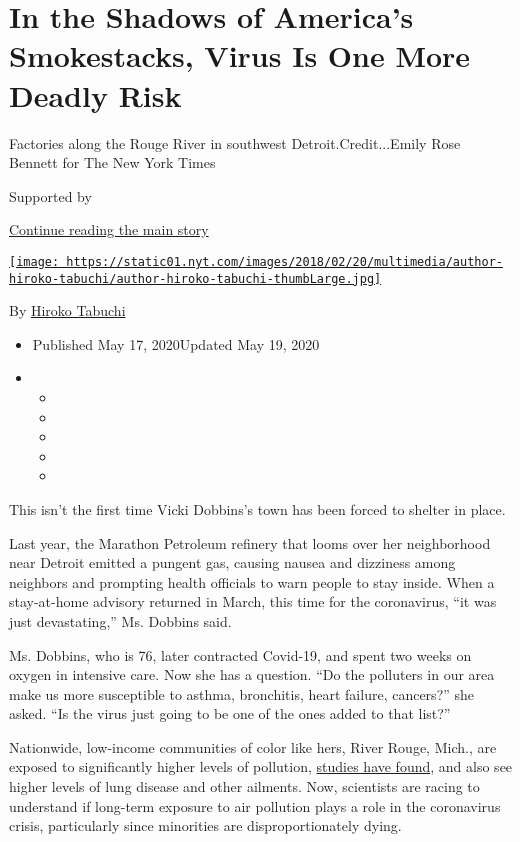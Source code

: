 \hypertarget{in-the-shadows-of-americas-smokestacks-virus-is-one-more-deadly-risk}{%
\section{In the Shadows of America's Smokestacks, Virus Is One More
Deadly
Risk}\label{in-the-shadows-of-americas-smokestacks-virus-is-one-more-deadly-risk}}

Factories along the Rouge River in southwest Detroit.Credit...Emily Rose
Bennett for The New York Times

Supported by

\protect\hyperlink{after-sponsor}{Continue reading the main story}

\href{https://www.nytimes.com/by/hiroko-tabuchi}{\texttt{[image: https://static01.nyt.com/images/2018/02/20/multimedia/author-hiroko-tabuchi/author-hiroko-tabuchi-thumbLarge.jpg]}}

By \href{https://www.nytimes.com/by/hiroko-tabuchi}{Hiroko Tabuchi}

\begin{itemize}
\item
  Published May 17, 2020Updated May 19, 2020
\item
  \begin{itemize}
  \item
  \item
  \item
  \item
  \item
  \end{itemize}
\end{itemize}

This isn't the first time Vicki Dobbins's town has been forced to
shelter in place.

Last year, the Marathon Petroleum refinery that looms over her
neighborhood near Detroit emitted a pungent gas, causing nausea and
dizziness among neighbors and prompting health officials to warn people
to stay inside. When a stay-at-home advisory returned in March, this
time for the coronavirus, ``it was just devastating,'' Ms. Dobbins said.

Ms. Dobbins, who is 76, later contracted Covid-19, and spent two weeks
on oxygen in intensive care. Now she has a question. ``Do the polluters
in our area make us more susceptible to asthma, bronchitis, heart
failure, cancers?'' she asked. ``Is the virus just going to be one of
the ones added to that list?''

Nationwide, low-income communities of color like hers, River Rouge,
Mich., are exposed to significantly higher levels of pollution,
\href{https://ajph.aphapublications.org/doi/abs/10.2105/AJPH.2017.304297?journalCode=ajph}{studies
have found}, and also see higher levels of lung disease and other
ailments. Now, scientists are racing to understand if long-term exposure
to air pollution plays a role in the coronavirus crisis, particularly
since minorities are disproportionately dying.

